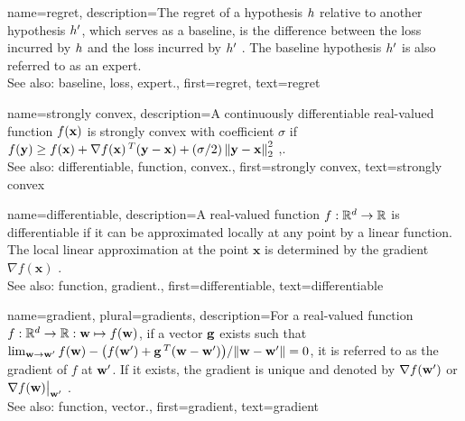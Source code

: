 {name={regret},
	description={The regret of a \gls{hypothesis} $h$ relative to 
		another \gls{hypothesis} $h'$, which serves as a \gls{baseline}, 
		is the difference between the \gls{loss} incurred by $h$ and the \gls{loss} 
		incurred by $h'$ \cite{PredictionLearningGames}. 
		The \gls{baseline} \gls{hypothesis} $h'$ is also referred to as an \gls{expert}.
					\\ 
		See also: \gls{baseline}, \gls{loss}, \gls{expert}.},
	first={regret},
	text={regret} 
}

{name={strongly convex},
	description={A continuously \gls{differentiable} real-valued 
		\gls{function} $f({\bf x})$ is strongly \gls{convex} with coefficient $\sigma$ if $f({\bf y}) \geq f({\bf x}) + \nabla f({\bf x})\,^{T} ({\bf y} - {\bf x}) + (\sigma/2) \left\Vert {{\bf y}- {\bf x}} \right\Vert_{2}^{2}$ \cite{nesterov04},\cite[Sec. B.1.1]{CvxAlgBertsekas}.
					\\ 
		See also: \gls{differentiable}, \gls{function}, \gls{convex}.},
	first={strongly convex},
	text={strongly convex} 
}

{name={differentiable},
	description={A real-valued \gls{function} $f: \mathbb{R}^{d} \rightarrow \mathbb{R}$ 
		is differentiable if it can be approximated locally at any point by a linear \gls{function}. 
		The local linear approximation at the point $\mathbf{x}$ is determined 
		by the \gls{gradient} $\nabla f ( \mathbf{x})$ \cite{RudinBookPrinciplesMatheAnalysis}.
					\\ 
		See also: \gls{function}, \gls{gradient}.},
	first={differentiable},
	text={differentiable} 
}

{name={gradient}, plural={gradients},
	description={For a real-valued \gls{function} 
		$f: \mathbb{R}^{d} \rightarrow \mathbb{R}: {\bf w} \mapsto f({\bf w})$, 
		if a \gls{vector} ${\bf g}$ exists such that 
		$\lim_{{\bf w} \rightarrow {\bf w}'} {f({\bf w}) - \big(f({\bf w}') + {\bf g}\,^{T} ({\bf w} - {\bf w}') \big) }/{\| {\bf w} - {\bf w}'\|}=0$, 
		it is referred to as the gradient of $f$ at ${\bf w}'$. If it exists, the gradient is unique and 
		denoted by $\nabla f({\bf w}')$ or $\nabla f({\bf w})\big|_{{\bf w}'}$ \cite{RudinBookPrinciplesMatheAnalysis}.
		\\
		See also: \gls{function}, \gls{vector}.},
	first={gradient},
	text={gradient} 
}

